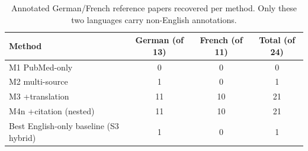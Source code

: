\begin{table}[h]
\centering\small
\caption{Annotated German/French reference papers recovered per method. Only these two languages carry non-English annotations.}
\label{tab:supp-language}
\begin{tabular}{lccc}
\toprule
Method & German (of 13) & French (of 11) & Total (of 24) \\
\midrule
M1 PubMed-only & 0 & 0 & 0 \\
M2 multi-source & 1 & 0 & 1 \\
M3 +translation & 11 & 10 & 21 \\
M4n +citation (nested) & 11 & 10 & 21 \\
\midrule
Best English-only baseline (S3 hybrid) & 1 & 0 & 1 \\
\bottomrule
\end{tabular}
\end{table}
